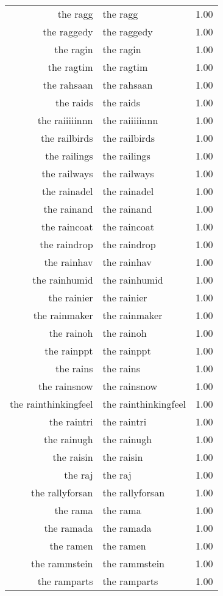 \begin{table}[ht]
\begin{tabular}{rlr}
  the ragg & the ragg & 1.00 \\ 
  the raggedy & the raggedy & 1.00 \\ 
  the ragin & the ragin & 1.00 \\ 
  the ragtim & the ragtim & 1.00 \\ 
  the rahsaan & the rahsaan & 1.00 \\ 
  the raids & the raids & 1.00 \\ 
  the raiiiiinnn & the raiiiiinnn & 1.00 \\ 
  the railbirds & the railbirds & 1.00 \\ 
  the railings & the railings & 1.00 \\ 
  the railways & the railways & 1.00 \\ 
  the rainadel & the rainadel & 1.00 \\ 
  the rainand & the rainand & 1.00 \\ 
  the raincoat & the raincoat & 1.00 \\ 
  the raindrop & the raindrop & 1.00 \\ 
  the rainhav & the rainhav & 1.00 \\ 
  the rainhumid & the rainhumid & 1.00 \\ 
  the rainier & the rainier & 1.00 \\ 
  the rainmaker & the rainmaker & 1.00 \\ 
  the rainoh & the rainoh & 1.00 \\ 
  the rainppt & the rainppt & 1.00 \\ 
  the rains & the rains & 1.00 \\ 
  the rainsnow & the rainsnow & 1.00 \\ 
  the rainthinkingfeel & the rainthinkingfeel & 1.00 \\ 
  the raintri & the raintri & 1.00 \\ 
  the rainugh & the rainugh & 1.00 \\ 
  the raisin & the raisin & 1.00 \\ 
  the raj & the raj & 1.00 \\ 
  the rallyforsan & the rallyforsan & 1.00 \\ 
  the rama & the rama & 1.00 \\ 
  the ramada & the ramada & 1.00 \\ 
  the ramen & the ramen & 1.00 \\ 
  the rammstein & the rammstein & 1.00 \\ 
  the ramparts & the ramparts & 1.00 \\ 

\end{tabular}
\end{table}
